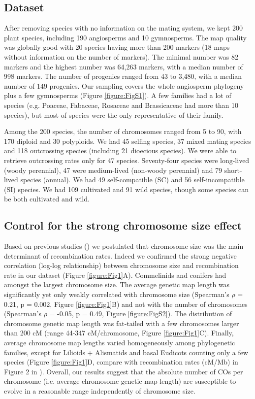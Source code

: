 \documentclass{article}
\begin{document}
\subsection*{Dataset}


After removing species with no information on the mating system, we kept 200 plant species, including 190 angiosperms and 10 gymnosperms. The map quality was globally good with 20 species having more than 200 markers (18 maps without information on the number of markers). The minimal number was 82 markers and the highest number was 64,263 markers, with a median number of 998 markers. The number of progenies ranged from 43 to 3,480, with a median number of 149 progenies. Our sampling covers the whole angiosperm phylogeny plus a few gymnosperms (Figure \ref{figure:FigS1}). A few families had a lot of species (e.g. Poaceae, Fabaceae, Rosaceae and Brassicaceae had more than 10 species), but most of species were the only representative of their family.


Among the 200 species, the number of chromosomes ranged from 5 to 90, with 170 diploid and 30 polyploids. We had 45 selfing species, 37 mixed mating species and 118 outcrossing species (including 21 dioecious species). We were able to retrieve outcrossing rates only for 47 species. Seventy-four species were long-lived (woody perennial), 47 were medium-lived (non-woody perennial) and 79 short-lived species (annual). We had 49 self-compatible (SC) and 56 self-incompatible (SI) species. We had 109 cultivated and 91 wild species, though some species can be both cultivated and wild.


\subsection*{Control for the strong chromosome size effect}


Based on previous studies (\cite{brazierDiversityDeterminantsRecombination2022b,haenelMetaanalysisChromosomescaleCrossover2018}) we postulated that chromosome size was the main determinant of recombination rates. Indeed we confirmed the strong negative correlation (log-log relationship) between chromosome size and recombination rate in our dataset (Figure \ref{figure:Fig1}A). Commelinids and conifers had amongst the largest chromosome size. The average genetic map length was significantly yet only weakly correlated with chromosome size (Spearman’s $\rho$ = 0.21, p = 0.002, Figure \ref{figure:Fig1}B) and not with the number of chromosomes (Spearman’s $\rho$ = -0.05, p = 0.49, Figure \ref{figure:FigS2}). The distribution of chromosome genetic map length was fat-tailed with a few chromosomes larger than 200 cM (range 44-347 cM/chromosome, Figure \ref{figure:Fig1}C). Finally, average chromosome map lengths varied homogeneously among phylogenetic families, except for Lilioids + Alismatids and basal Eudicots counting only a few species (Figure \ref{figure:Fig1}D, compare with recombination rates (cM/Mb) in Figure 2 in \cite{stapleyVariationRecombinationFrequency2017}). Overall, our results suggest that the absolute number of COs per chromosome (i.e. average chromosome genetic map length) are susceptible to evolve in a reasonable range independently of chromosome size.
\end{document}
